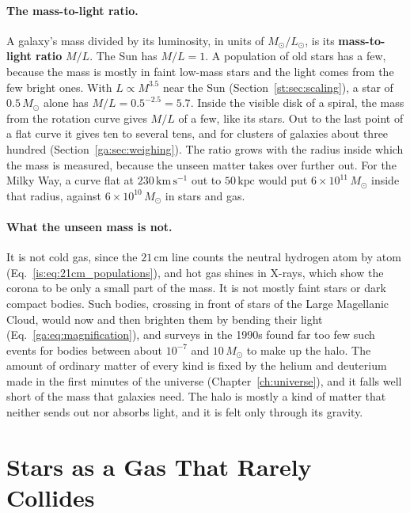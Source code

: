 \paragraph{The mass-to-light ratio.} A galaxy's mass divided by its luminosity, in units of $M_\odot/L_\odot$, is its \textbf{mass-to-light ratio} $M/L$. The Sun has $M/L=1$. A population of old stars has a few, because the mass is mostly in faint low-mass stars and the light comes from the few bright ones. With $L\propto M^{3.5}$ near the Sun (Section~\ref{st:sec:scaling}), a star of $0.5\,M_\odot$ alone has $M/L=0.5^{-2.5}=5.7$. Inside the visible disk of a spiral, the mass from the rotation curve gives $M/L$ of a few, like its stars. Out to the last point of a flat curve it gives ten to several tens, and for clusters of galaxies about three hundred (Section~\ref{ga:sec:weighing}). The ratio grows with the radius inside which the mass is measured, because the unseen matter takes over further out. For the Milky Way, a curve flat at $230\,\mathrm{km\,s^{-1}}$ out to $50\,\mathrm{kpc}$ would put $6\times10^{11}\,M_\odot$ inside that radius, against $6\times10^{10}\,M_\odot$ in stars and gas.

\paragraph{What the unseen mass is not.} It is not cold gas, since the $21\,\mathrm{cm}$ line counts the neutral hydrogen atom by atom (Eq.~\eqref{is:eq:21cm_populations}), and hot gas shines in X-rays, which show the corona to be only a small part of the mass. It is not mostly faint stars or dark compact bodies. Such bodies, crossing in front of stars of the Large Magellanic Cloud, would now and then brighten them by bending their light (Eq.~\eqref{ga:eq:magnification}), and surveys in the 1990s found far too few such events for bodies between about $10^{-7}$ and $10\,M_\odot$ to make up the halo. The amount of ordinary matter of every kind is fixed by the helium and deuterium made in the first minutes of the universe (Chapter~\ref{ch:universe}), and it falls well short of the mass that galaxies need. The halo is mostly a kind of matter that neither sends out nor absorbs light, and it is felt only through its gravity.

\section{Stars as a Gas That Rarely Collides}
\label{ga:sec:relaxation}

